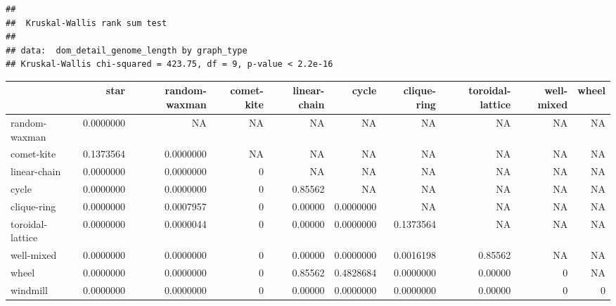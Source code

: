 \documentclass[
]{book}
\newenvironment{Shaded}{\begin{snugshade}}{\end{snugshade}}
\newcommand{\AttributeTok}[1]{\textcolor[rgb]{0.77,0.63,0.00}{#1}}
\newcommand{\ConstantTok}[1]{\textcolor[rgb]{0.00,0.00,0.00}{#1}}
\newcommand{\FunctionTok}[1]{\textcolor[rgb]{0.00,0.00,0.00}{#1}}
\newcommand{\NormalTok}[1]{#1}
\newcommand{\OtherTok}[1]{\textcolor[rgb]{0.56,0.35,0.01}{#1}}
\newcommand{\SpecialCharTok}[1]{\textcolor[rgb]{0.00,0.00,0.00}{#1}}
\newcommand{\StringTok}[1]{\textcolor[rgb]{0.31,0.60,0.02}{#1}}
\begin{document}
\begin{verbatim}
## 
##  Kruskal-Wallis rank sum test
## 
## data:  dom_detail_genome_length by graph_type
## Kruskal-Wallis chi-squared = 423.75, df = 9, p-value < 2.2e-16
\end{verbatim}

\begin{Shaded}
\end{Shaded}

\begin{table}
\centering
\begin{tabular}[t]{l|r|r|r|r|r|r|r|r|r}
\hline
  & star & random-waxman & comet-kite & linear-chain & cycle & clique-ring & toroidal-lattice & well-mixed & wheel\\
\hline
random-waxman & 0.0000000 & NA & NA & NA & NA & NA & NA & NA & NA\\
\hline
comet-kite & 0.1373564 & 0.0000000 & NA & NA & NA & NA & NA & NA & NA\\
\hline
linear-chain & 0.0000000 & 0.0000000 & 0 & NA & NA & NA & NA & NA & NA\\
\hline
cycle & 0.0000000 & 0.0000000 & 0 & 0.85562 & NA & NA & NA & NA & NA\\
\hline
clique-ring & 0.0000000 & 0.0007957 & 0 & 0.00000 & 0.0000000 & NA & NA & NA & NA\\
\hline
toroidal-lattice & 0.0000000 & 0.0000044 & 0 & 0.00000 & 0.0000000 & 0.1373564 & NA & NA & NA\\
\hline
well-mixed & 0.0000000 & 0.0000000 & 0 & 0.00000 & 0.0000000 & 0.0016198 & 0.85562 & NA & NA\\
\hline
wheel & 0.0000000 & 0.0000000 & 0 & 0.85562 & 0.4828684 & 0.0000000 & 0.00000 & 0 & NA\\
\hline
windmill & 0.0000000 & 0.0000000 & 0 & 0.00000 & 0.0000000 & 0.0000000 & 0.00000 & 0 & 0\\
\hline
\end{tabular}
\end{table}
\end{document}
